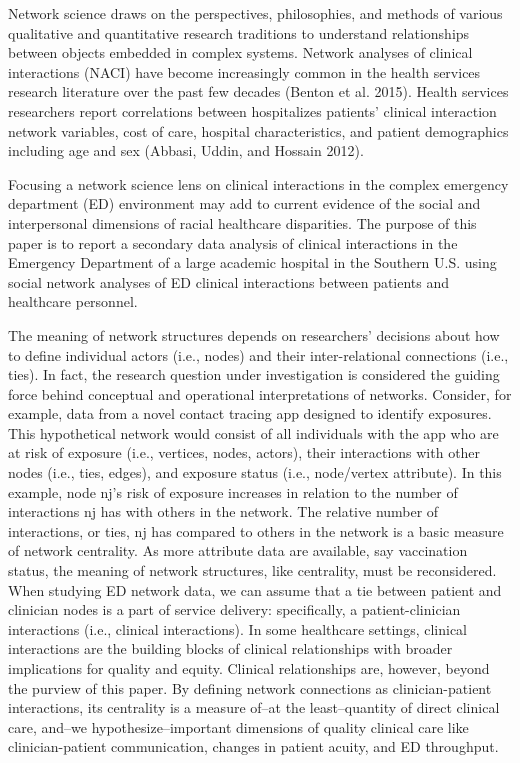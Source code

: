 \documentclass[
]{article}
\begin{document}
Network science draws on the perspectives, philosophies, and methods of
various qualitative and quantitative research traditions to understand
relationships between objects embedded in complex systems. Network
analyses of clinical interactions (NACI) have become increasingly common
in the health services research literature over the past few decades
(Benton et al. 2015). Health services researchers report correlations
between hospitalizes patients' clinical interaction network variables,
cost of care, hospital characteristics, and patient demographics
including age and sex (Abbasi, Uddin, and Hossain 2012).

Focusing a network science lens on clinical interactions in the complex
emergency department (ED) environment may add to current evidence of the
social and interpersonal dimensions of racial healthcare disparities.
The purpose of this paper is to report a secondary data analysis of
clinical interactions in the Emergency Department of a large academic
hospital in the Southern U.S. using social network analyses of ED
clinical interactions between patients and healthcare personnel.

The meaning of network structures depends on researchers' decisions
about how to define individual actors (i.e., nodes) and their
inter-relational connections (i.e., ties). In fact, the research
question under investigation is considered the guiding force behind
conceptual and operational interpretations of networks. Consider, for
example, data from a novel contact tracing app designed to identify
exposures. This hypothetical network would consist of all individuals
with the app who are at risk of exposure (i.e., vertices, nodes,
actors), their interactions with other nodes (i.e., ties, edges), and
exposure status (i.e., node/vertex attribute). In this example, node
nj's risk of exposure increases in relation to the number of
interactions nj has with others in the network. The relative number of
interactions, or ties, nj has compared to others in the network is a
basic measure of network centrality. As more attribute data are
available, say vaccination status, the meaning of network structures,
like centrality, must be reconsidered. When studying ED network data, we
can assume that a tie between patient and clinician nodes is a part of
service delivery: specifically, a patient-clinician interactions (i.e.,
clinical interactions). In some healthcare settings, clinical
interactions are the building blocks of clinical relationships with
broader implications for quality and equity. Clinical relationships are,
however, beyond the purview of this paper. By defining network
connections as clinician-patient interactions, its centrality is a
measure of--at the least--quantity of direct clinical care, and--we
hypothesize--important dimensions of quality clinical care like
clinician-patient communication, changes in patient acuity, and ED
throughput.
\end{document}

